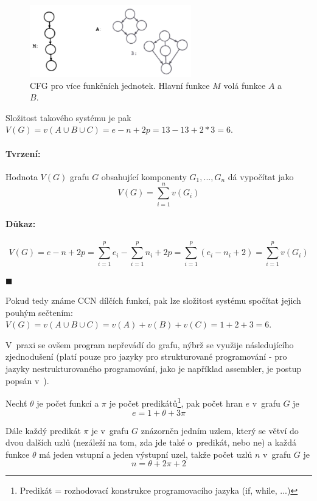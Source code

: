 \documentclass[11pt,twoside,a4paper]{book}
\begin{document}
\begin{figure}[H]
\begin{center}
\includegraphics[width=7cm]{figures/ccn_functions.pdf}
\caption{CFG pro více funkčních jednotek. Hlavní funkce $M$ volá funkce $A$ a $B$.}
\label{fig:ccn_functions}
\end{center}
\end{figure}

Složitost takového systému je pak $V(G) = v(A \cup B \cup C) = e - n + 2p = 13 - 13 + 2 * 3 = 6$.

\paragraph{Tvrzení:}
Hodnota $V(G)$ grafu $G$ obsahující komponenty $G_1, ..., G_n$ dá vypočítat jako
$$V(G) = \sum_{i=1}^n{v(G_i)}$$

\paragraph{Důkaz:}
$$V(G) = e - n + 2p = \sum_{i=1}^p{e_i} - \sum_{i=1}^p{n_i} + 2p = \sum_{i=1}^p{(e_i - n_i + 2)} = \sum_{i=1}^p{v(G_i)}$$
\begin{flushright}$\blacksquare$\end{flushright}

Pokud tedy známe CCN dílčích funkcí, pak lze složitost systému spočítat jejich pouhým sečtením:
$V(G) = v(A \cup B \cup C) = v(A) + v(B) + v(C) = 1 + 2 + 3 = 6$.

V~praxi se ovšem program nepřevádí do grafu, nýbrž se využije následujícího zjednodušení (platí pouze pro jazyky pro strukturované
programování - pro jazyky nestrukturovaného programování, jako je například assembler, je postup popsán v~\cite{CCN}).

Nechť $\theta$ je počet funkcí a $\pi$ je počet predikátů\footnote{Predikát = rozhodovací konstrukce programovacího jazyka (if, while, ...)},
pak počet hran $e$ v~grafu $G$ je
$$e = 1 + \theta + 3\pi$$

Dále každý predikát $\pi$ je v~grafu $G$ znázorněn jedním uzlem, který se větví do dvou dalších uzlů (nezáleží na tom, zda jde také o~predikát, nebo ne)
a každá funkce $\theta$ má jeden vstupní a jeden výstupní uzel, takže počet uzlů $n$ v~grafu $G$ je
$$n = \theta + 2\pi + 2$$
\end{document}
